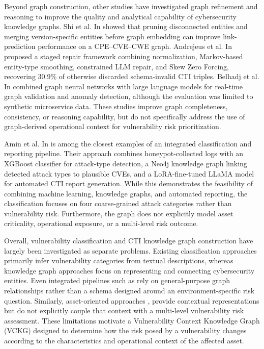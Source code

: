 \documentclass[conference]{IEEEtran}
\begin{document}
Beyond graph construction, other studies have investigated graph refinement and reasoning to improve the quality and analytical capability of cybersecurity knowledge graphs. Shi et al. In \cite{b7} showed that pruning disconnected entities and merging version-specific entities before graph embedding can improve link-prediction performance on a CPE–CVE–CWE graph. Andrejeus et al. In \cite{b12} proposed a staged repair framework combining normalization, Markov-based entity-type smoothing, constrained LLM repair, and Skew Zero Forcing, recovering 30.9\% of otherwise discarded schema-invalid CTI triples. Belhadj et al. In \cite{b10} combined graph neural networks with large language models for real-time graph validation and anomaly detection, although the evaluation was limited to synthetic microservice data. These studies improve graph completeness, consistency, or reasoning capability, but do not specifically address the use of graph-derived operational context for vulnerability risk prioritization.

Amin et al. In \cite{b2} is among the closest examples of an integrated classification and reporting pipeline. Their approach combines honeypot-collected logs with an XGBoost classifier for attack-type detection, a Neo4j knowledge graph linking detected attack types to plausible CVEs, and a LoRA-fine-tuned LLaMA model for automated CTI report generation. While this demonstrates the feasibility of combining machine learning, knowledge graphs, and automated reporting, the classification focuses on four coarse-grained attack categories rather than vulnerability risk. Furthermore, the graph does not explicitly model asset criticality, operational exposure, or a multi-level risk outcome.

Overall, vulnerability classification and CTI knowledge graph construction have largely been investigated as separate problems. Existing classification approaches primarily infer vulnerability categories from textual descriptions, whereas knowledge graph approaches focus on representing and connecting cybersecurity entities. Even integrated pipelines such as \cite{b2} rely on general-purpose graph relationships rather than a schema designed around an environment-specific risk question. Similarly, asset-oriented approaches \cite{b5}, \cite{b11} provide contextual representations but do not explicitly couple that context with a multi-level vulnerability risk assessment. These limitations motivate a Vulnerability Context Knowledge Graph (VCKG) designed to determine how the risk posed by a vulnerability changes according to the characteristics and operational context of the affected asset.
\end{document}
